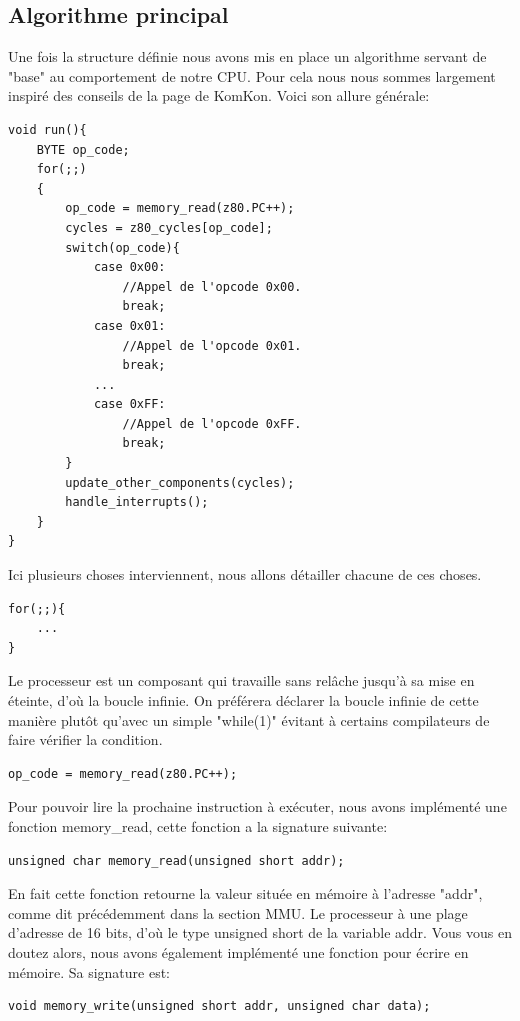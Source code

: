 \documentclass{report}
\begin{document}
\subsection{Algorithme principal}
Une fois la structure définie nous avons mis en place un algorithme servant de "base" au comportement de notre CPU. Pour cela nous nous sommes largement inspiré des conseils de la page de KomKon\cite{komkon}. Voici son allure générale:
 \begin{lstlisting}
void run(){
	BYTE op_code;
	for(;;)
	{
		op_code = memory_read(z80.PC++);
		cycles = z80_cycles[op_code];
		switch(op_code){	
			case 0x00:
				//Appel de l'opcode 0x00.
				break;
			case 0x01:
				//Appel de l'opcode 0x01.
				break;
			...
			case 0xFF:
				//Appel de l'opcode 0xFF.
				break;
		}
		update_other_components(cycles);
		handle_interrupts();
	}
}
 \end{lstlisting}		
Ici plusieurs choses interviennent, nous allons détailler chacune de ces choses.
\begin{lstlisting}
for(;;){
	...
}
\end{lstlisting}
Le processeur est un composant qui travaille sans relâche jusqu'à sa mise en éteinte, d'où la boucle infinie. On préférera déclarer la boucle infinie de cette manière plutôt qu'avec un simple "while(1)" évitant à certains compilateurs de faire vérifier la condition.
\begin{lstlisting}
op_code = memory_read(z80.PC++);
\end{lstlisting}
Pour pouvoir lire la prochaine instruction à exécuter, nous avons implémenté une fonction memory\_read, cette fonction a la signature suivante:
\begin{lstlisting}
unsigned char memory_read(unsigned short addr);
\end{lstlisting}
En fait cette fonction retourne la valeur située en mémoire à l'adresse "addr", comme dit précédemment dans la section MMU. Le processeur à une plage d'adresse de 16 bits, d'où le type unsigned short de la variable addr.
Vous vous en doutez alors, nous avons également implémenté une fonction pour écrire en mémoire. Sa signature est:
\begin{lstlisting}
void memory_write(unsigned short addr, unsigned char data);
\end{lstlisting}
\end{document}
